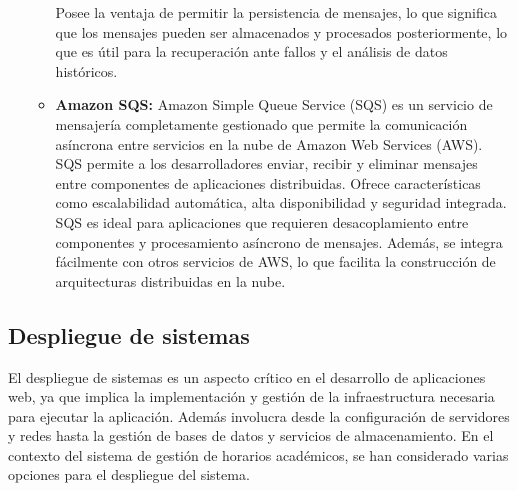 \begin{itemize}
\begin{itemize}
        Posee la ventaja de permitir la persistencia de mensajes, lo que significa que los mensajes pueden ser almacenados y procesados posteriormente, lo que es útil para la recuperación ante fallos y el análisis de datos históricos.
        \item \textbf{Amazon SQS\cite{amazonsqs}:} Amazon Simple Queue Service (SQS) es un servicio de mensajería completamente gestionado que permite la comunicación asíncrona entre servicios en la nube de Amazon Web Services (AWS). SQS permite a los desarrolladores enviar, recibir y eliminar mensajes entre componentes de aplicaciones distribuidas. Ofrece características como escalabilidad automática, alta disponibilidad y seguridad integrada.
        SQS es ideal para aplicaciones que requieren desacoplamiento entre componentes y procesamiento asíncrono de mensajes. Además, se integra fácilmente con otros servicios de AWS, lo que facilita la construcción de arquitecturas distribuidas en la nube.
    \end{itemize}
\end{itemize}

\subsection{Despliegue de sistemas}

El despliegue de sistemas es un aspecto crítico en el desarrollo de aplicaciones web, ya que implica la implementación y gestión de la infraestructura necesaria para ejecutar la aplicación. Además involucra desde la configuración de servidores y redes hasta la gestión de bases de datos y servicios de almacenamiento. En el contexto del sistema de gestión de horarios académicos, se han considerado varias opciones para el despliegue del sistema.

